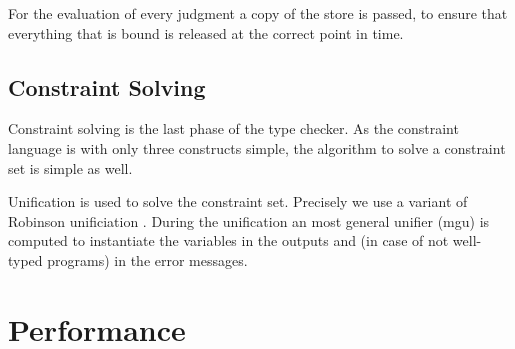 For the evaluation of every judgment a copy of the store is passed, to
ensure that everything that is bound is released at the correct point
in time.



\subsection{Constraint Solving}
\label{sec:constraint-solving}
Constraint solving is the last phase of the type checker. As the
constraint language is with only three constructs simple, the
algorithm to solve a constraint set is simple as well.

Unification is used to solve the constraint set. Precisely we use a
variant of Robinson unificiation . During the
unification an most general unifier (mgu) is computed to instantiate
the variables in the outputs and (in case of not well-typed programs)
in the error messages.
\section{Performance}
\label{sec:performance}

